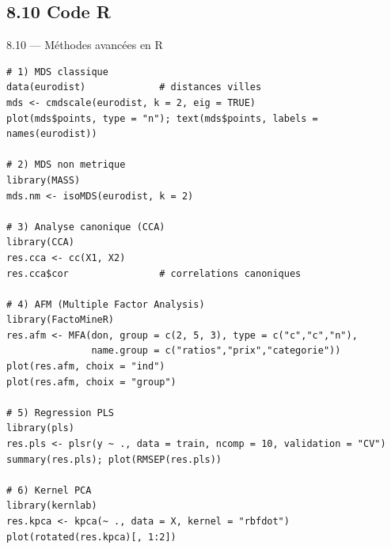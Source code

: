 \subsection{8.10 Code R}
\begin{frame}[fragile]{8.10 — Méthodes avancées en R}
\begin{lstlisting}
# 1) MDS classique
data(eurodist)             # distances villes
mds <- cmdscale(eurodist, k = 2, eig = TRUE)
plot(mds$points, type = "n"); text(mds$points, labels = names(eurodist))

# 2) MDS non metrique
library(MASS)
mds.nm <- isoMDS(eurodist, k = 2)

# 3) Analyse canonique (CCA)
library(CCA)
res.cca <- cc(X1, X2)
res.cca$cor                # correlations canoniques

# 4) AFM (Multiple Factor Analysis)
library(FactoMineR)
res.afm <- MFA(don, group = c(2, 5, 3), type = c("c","c","n"),
               name.group = c("ratios","prix","categorie"))
plot(res.afm, choix = "ind")
plot(res.afm, choix = "group")

# 5) Regression PLS
library(pls)
res.pls <- plsr(y ~ ., data = train, ncomp = 10, validation = "CV")
summary(res.pls); plot(RMSEP(res.pls))

# 6) Kernel PCA
library(kernlab)
res.kpca <- kpca(~ ., data = X, kernel = "rbfdot")
plot(rotated(res.kpca)[, 1:2])
\end{lstlisting}
\end{frame}

